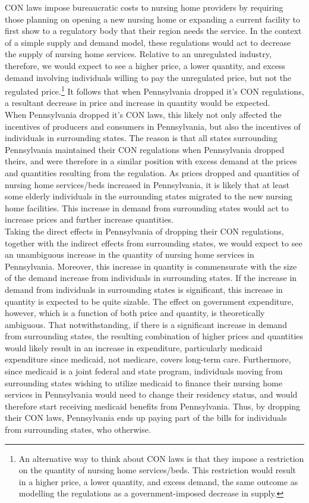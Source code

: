 \documentclass[../Main.tex]{subfiles}
\begin{document}
CON laws impose bureaucratic costs to nursing home providers by requiring those planning on opening a new nursing home or expanding a current facility to first show to a regulatory body that their region needs the service. In the context of a simple supply and demand model, these regulations would act to decrease the supply of nursing home services. Relative to an unregulated industry, therefore, we would expect to see a higher price, a lower quantity, and excess demand involving individuals willing to pay the unregulated price, but not the regulated price.\footnote{An alternative way to think about CON laws is that they impose a restriction on the quantity of nursing home services/beds. This restriction would result in a higher price, a lower quantity, and excess demand, the same outcome as modelling the regulations as a government-imposed decrease in supply.} It follows that when Pennsylvania dropped it's CON regulations, a resultant decrease in price and increase in quantity would be expected.\\ 
\indent When Pennsylvania dropped it's CON laws, this likely not only affected the incentives of producers and consumers in Pennsylvania, but also the incentives of individuals in surrounding states. The reason is that all states surrounding Pennsylvania maintained their CON regulations when Pennsylvania dropped theirs, and were therefore in a similar position with excess demand at the prices and quantities resulting from the regulation. As prices dropped and quantities of nursing home services/beds increased in Pennsylvania, it is likely that at least some elderly individuals in the surrounding states migrated to the new nursing home facilities. This increase in demand from surrounding states would act to increase prices and further increase quantities.\\ 
\indent Taking the direct effects in Pennsylvania of dropping their CON regulations, together with the indirect effects from surrounding states, we would expect to see an unambiguous increase in the quantity of nursing home services in Pennsylvania. Moreover, this increase in quantity is commensurate with the size of the demand increase from individuals in surrounding states. If the increase in demand from individuals in surrounding states is significant, this increase in quantity is expected to be quite sizable. The effect on government expenditure, however, which is a function of both price and quantity, is theoretically ambiguous. That notwithstanding, if there is a significant increase in demand from surrounding states, the resulting combination of higher prices and quantities would likely result in an increase in expenditure, particularly medicaid expenditure since medicaid, not medicare, covers long-term care. Furthermore, since medicaid is a joint federal and state program, individuals moving from surrounding states wishing to utilize medicaid to finance their nursing home services in Pennsylvania would need to change their residency status, and would therefore start receiving medicaid benefits from Pennsylvania. Thus, by dropping their CON laws, Pennsylvania ends up paying part of the bills for individuals from surrounding states, who otherwise.\\
\end{document}
